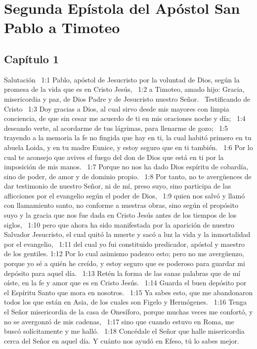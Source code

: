 \chapter{Segunda Epístola del Apóstol San Pablo a Timoteo}


\section*{Capítulo 1 }
Salutación  
1:1 Pablo, apóstol de Jesucristo por la voluntad de Dios, según la promesa de la vida que es en Cristo Jesús,  
1:2 a Timoteo, amado hijo: Gracia, misericordia y paz, de Dios Padre y de Jesucristo nuestro Señor.  
Testificando de Cristo  
1:3 Doy gracias a Dios, al cual sirvo desde mis mayores con limpia conciencia, de que sin cesar me acuerdo de ti en mis oraciones noche y día;  
1:4 deseando verte, al acordarme de tus lágrimas, para llenarme de gozo;  
1:5 trayendo a la memoria la fe no fingida que hay en ti, la cual habitó primero en tu abuela Loida, y en tu madre Eunice, y estoy seguro que en ti también.  
1:6 Por lo cual te aconsejo que avives el fuego del don de Dios que está en ti por la imposición de mis manos.  
1:7 Porque no nos ha dado Dios espíritu de cobardía, sino de poder, de amor y de dominio propio.  
1:8 Por tanto, no te avergüences de dar testimonio de nuestro Señor, ni de mí, preso suyo, sino participa de las aflicciones por el evangelio según el poder de Dios,  
1:9 quien nos salvó y llamó con llamamiento santo, no conforme a nuestras obras, sino según el propósito suyo y la gracia que nos fue dada en Cristo Jesús antes de los tiempos de los siglos,  
1:10 pero que ahora ha sido manifestada por la aparición de nuestro Salvador Jesucristo, el cual quitó la muerte y sacó a luz la vida y la inmortalidad por el evangelio,  
1:11 del cual yo fui constituido predicador, apóstol y maestro de los gentiles. 
1:12 Por lo cual asimismo padezco esto; pero no me avergüenzo, porque yo sé a quién he creído, y estoy seguro que es poderoso para guardar mi depósito para aquel día.  
1:13 Retén la forma de las sanas palabras que de mí oíste, en la fe y amor que es en Cristo Jesús.  
1:14 Guarda el buen depósito por el Espíritu Santo que mora en nosotros.  
1:15 Ya sabes esto, que me abandonaron todos los que están en Asia, de los cuales son Figelo y Hermógenes.  
1:16 Tenga el Señor misericordia de la casa de Onesíforo, porque muchas veces me confortó, y no se avergonzó de mis cadenas,  
1:17 sino que cuando estuvo en Roma, me buscó solícitamente y me halló.  
1:18 Concédale el Señor que halle misericordia cerca del Señor en aquel día. Y cuánto nos ayudó en Efeso, tú lo sabes mejor.  
